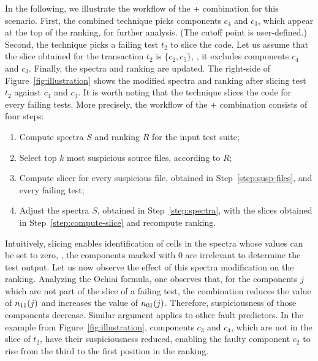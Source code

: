\documentclass{article}
\begin{document}
In the following, we illustrate the workflow of the \sfl{}+\cs{}
combination for this scenario. First, the combined technique picks
components $c_4$ and $c_3$, which appear at the top of the ranking,
for further analysis. (The cutoff point is user-defined.) Second, the
technique picks a failing test $t_2$ to slice the code.  Let us assume
that the slice obtained for the transaction $t_2$ is $\{c_2, c_5\}$,
\ie, it excludes components $c_4$ and $c_3$. Finally, the spectra and
ranking are updated. The right-side of Figure~\ref{fig:illustration}
shows the modified spectra and ranking after slicing test $t_2$
against $c_4$ and $c_3$. It is worth noting that the technique slices
the code for every failing tests. More precisely, the workflow of the
\sfl{}+\cs{} combination consists of four steps: 

\begin{enumerate}
  \itemsep0em
  \item\label{step:spectra} Compute spectra $S$ and ranking $R$ for
  the input test suite;
  \item\label{step:susp-files} Select top $k$ most suspicious source
  files, according to $R$;
  \item\label{step:compute-slice} Compute slicer for every suspicious
    file, obtained in Step~\ref{step:susp-files}, and every failing test;
  \item Adjust the spectra $S$, obtained in Step~\ref{step:spectra}, with
    the slices obtained in Step~\ref{step:compute-slice} and recompute ranking.
\end{enumerate}

Intuitively, slicing enables identification of cells in the spectra
whose values can be set to zero, \ie{}, the components marked with 0
are irrelevant to determine the test output. Let us now observe the
effect of this spectra modification on the ranking. Analyzing the
Ochiai formula, one observes that, for the components $j$ which are
not part of the slice of a failing test, the combination reduces the
value of $n_{11}(j)$ and increases the value of $n_{01}(j)$. Therefore,
suspiciousness of those components decrease. Similar argument applies
to other fault predictors. In the example from
Figure~\ref{fig:illustration}, components $c_3$ and $c_4$, which are
not in the slice of $t_2$, have their suspiciousness reduced, enabling
the faulty component $c_2$ to rise from the third to the first
position in the ranking.
\end{document}
